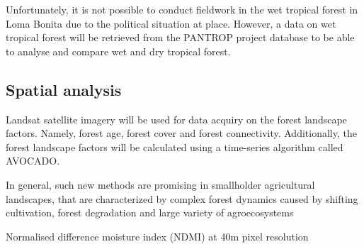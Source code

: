 Unfortunately, it is not possible to conduct fieldwork in the wet tropical forest in Loma Bonita due to the political situation at place. However, a data on wet tropical forest will be retrieved from the PANTROP project database to be able to analyse and compare wet and dry tropical forest.

\subsection{Spatial analysis}
Landsat satellite imagery will be used for data acquiry on the forest landscape factors. Namely, forest age, forest cover and forest connectivity. Additionally, the forest landscape factors will be calculated using a time-series algorithm called AVOCADO. 

In general, such new methods are promising in
smallholder agricultural landscapes, that are characterized by complex
forest dynamics caused by shifting cultivation, forest degradation and
large variety of agroecosystems

Normalised difference moisture index (NDMI) at 40m pixel resolution
 